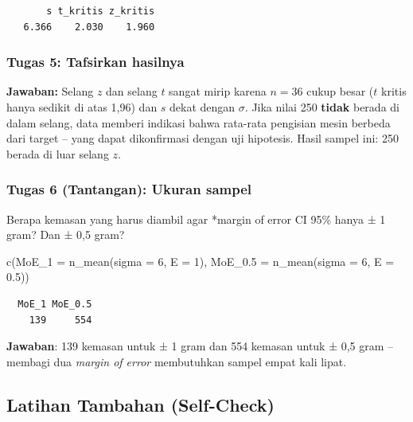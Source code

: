 \documentclass[
  indonesian,
  letterpaper,
]{book}
\newenvironment{Shaded}{\begin{snugshade}}{\end{snugshade}}
\newcommand{\AttributeTok}[1]{\textcolor[rgb]{0.40,0.45,0.13}{#1}}
\newcommand{\DecValTok}[1]{\textcolor[rgb]{0.68,0.00,0.00}{#1}}
\newcommand{\FloatTok}[1]{\textcolor[rgb]{0.68,0.00,0.00}{#1}}
\newcommand{\FunctionTok}[1]{\textcolor[rgb]{0.28,0.35,0.67}{#1}}
\newcommand{\NormalTok}[1]{\textcolor[rgb]{0.00,0.23,0.31}{#1}}
\begin{document}
\begin{verbatim}
       s t_kritis z_kritis 
   6.366    2.030    1.960 
\end{verbatim}

\subsubsection{Tugas 5: Tafsirkan
hasilnya}\label{tugas-5-tafsirkan-hasilnya}

\textbf{Jawaban:} Selang \(z\) dan selang \(t\) sangat mirip karena
\(n = 36\) cukup besar (\(t\) kritis hanya sedikit di atas 1,96) dan
\(s\) dekat dengan \(\sigma\). Jika nilai 250 \textbf{tidak} berada di
dalam selang, data memberi indikasi bahwa rata-rata pengisian mesin
berbeda dari target -- yang dapat dikonfirmasi dengan uji hipotesis.
Hasil sampel ini: 250 berada di luar selang \(z\).

\subsubsection{Tugas 6 (Tantangan): Ukuran
sampel}\label{tugas-6-tantangan-ukuran-sampel}

Berapa kemasan yang harus diambil agar *margin of error CI 95\% hanya ±
1 gram? Dan ± 0,5 gram?

\begin{Shaded}
\begin{Highlighting}[]
\FunctionTok{c}\NormalTok{(}\AttributeTok{MoE\_1 =} \FunctionTok{n\_mean}\NormalTok{(}\AttributeTok{sigma =} \DecValTok{6}\NormalTok{, }\AttributeTok{E =} \DecValTok{1}\NormalTok{), }\AttributeTok{MoE\_0.5 =} \FunctionTok{n\_mean}\NormalTok{(}\AttributeTok{sigma =} \DecValTok{6}\NormalTok{, }\AttributeTok{E =} \FloatTok{0.5}\NormalTok{))}
\end{Highlighting}
\end{Shaded}

\begin{verbatim}
  MoE_1 MoE_0.5 
    139     554 
\end{verbatim}

\textbf{Jawaban}: 139 kemasan untuk ± 1 gram dan 554 kemasan untuk ± 0,5
gram -- membagi dua \emph{margin of error} membutuhkan sampel empat kali
lipat.

\subsection{Latihan Tambahan
(Self-Check)}\label{latihan-tambahan-self-check}
\end{document}
